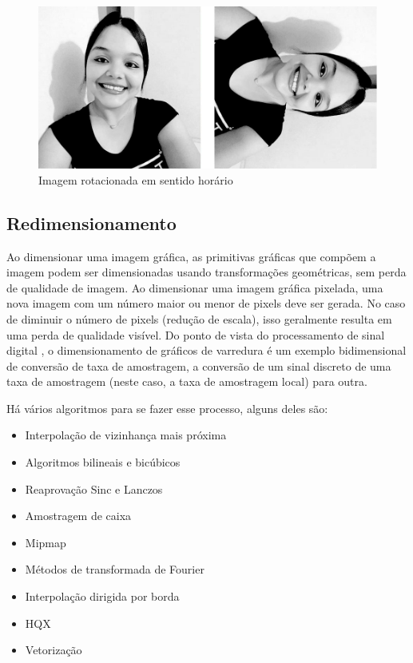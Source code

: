 			\begin{figure}[!htb]
					\centering
					\includegraphics[width=\textwidth]{img/04-rotacao-2.jpg}
					\caption{Imagem rotacionada em sentido horário}
			\end{figure}
	
			\lstset{language=Python}
			{\tiny }
			
	\subsection{Redimensionamento}
		Ao dimensionar uma imagem gráfica, as primitivas gráficas que compõem a imagem podem ser dimensionadas usando transformações geométricas, sem perda de qualidade de imagem. Ao dimensionar uma imagem gráfica pixelada, uma nova imagem com um número maior ou menor de pixels deve ser gerada.
		No caso de diminuir o número de pixels (redução de escala), isso geralmente resulta em uma perda de qualidade visível. Do ponto de vista do processamento de sinal digital , o dimensionamento de gráficos de varredura é um exemplo bidimensional de conversão de taxa de amostragem, a conversão de um sinal discreto de uma taxa de amostragem (neste caso, a taxa de amostragem local) para outra.
		
		Há vários algoritmos para se fazer esse processo, alguns deles são: 
		\begin{itemize}
			\item Interpolação de vizinhança mais próxima
			\item Algoritmos bilineais e bicúbicos
			\item Reaprovação Sinc e Lanczos
			\item Amostragem de caixa
			\item Mipmap
			\item Métodos de transformada de Fourier
			\item Interpolação dirigida por borda
			\item HQX
			\item Vetorização			
		\end{itemize}
		

